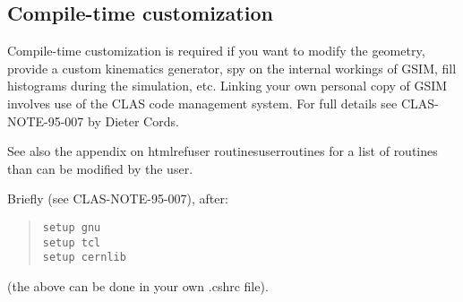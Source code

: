 \documentclass{article}
\begin{document}
\subsection{Compile-time customization}
\label{compiletime}
Compile-time customization is required if you want to modify the
geometry, provide a custom kinematics generator, spy on the internal
workings of GSIM, fill histograms during the simulation, etc.  Linking
your own personal copy of GSIM involves use of the CLAS code
management system.  For full details see CLAS-NOTE-95-007 by Dieter
Cords.

See also the appendix on htmlref{user routines}{userroutines} for a
list of routines than can be modified by the user.

Briefly (see CLAS-NOTE-95-007), after:
\begin{quote}
{\tt setup gnu} \\
{\tt setup tcl} \\
{\tt setup cernlib}
\end{quote}
(the above can be done in your own .cshrc file).
\end{document}
